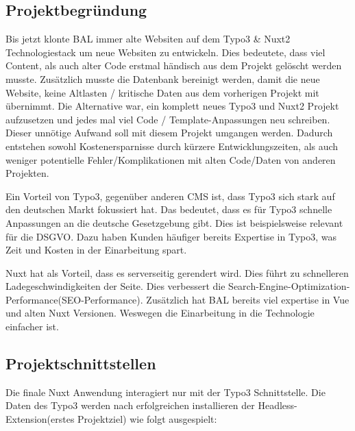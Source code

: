 \subsection{Projektbegründung} 
\label{sec:Projektbegruendung}
Bis jetzt klonte \acs{BAL} immer alte Websiten auf dem Typo3 \& Nuxt2 Technologiestack um neue Websiten zu entwickeln. Dies bedeutete, dass viel Content, als auch alter Code erstmal händisch aus dem Projekt gelöscht werden musste. Zusätzlich musste die Datenbank bereinigt werden, damit die neue Website, keine Altlasten / kritische Daten aus dem vorherigen Projekt mit übernimmt. Die Alternative war, ein komplett neues Typo3 und Nuxt2 Projekt aufzusetzen und jedes mal viel Code / Template-Anpassungen neu schreiben. Dieser unnötige Aufwand soll mit diesem Projekt umgangen werden. Dadurch entstehen sowohl Kostenersparnisse durch kürzere Entwicklungszeiten, als auch weniger potentielle Fehler/Komplikationen mit alten Code/Daten von anderen Projekten.

Ein Vorteil von Typo3, gegenüber anderen \acs{CMS} ist, dass Typo3 sich stark auf den deutschen Markt fokussiert hat. Das bedeutet, dass es für Typo3 schnelle Anpassungen an die deutsche Gesetzgebung gibt. Dies ist beispielsweise relevant für die \acs{DSGVO}. Dazu haben Kunden häufiger bereits Expertise in Typo3, was Zeit und Kosten in der Einarbeitung spart.

Nuxt hat als Vorteil, dass es serverseitig gerendert wird. Dies führt zu schnelleren Ladegeschwindigkeiten der Seite. Dies verbessert die Search-Engine-Optimization-Performance(\acs{SEO}-Performance). Zusätzlich hat \acs{BAL} bereits viel expertise in Vue und alten Nuxt Versionen. Weswegen die Einarbeitung in die Technologie einfacher ist.

\subsection{Projektschnittstellen} 
\label{sec:Projektschnittstellen}

Die finale Nuxt Anwendung interagiert nur mit der Typo3 Schnittstelle. Die Daten des Typo3 werden nach erfolgreichen installieren der Headless-Extension(erstes Projektziel) wie folgt ausgespielt:

